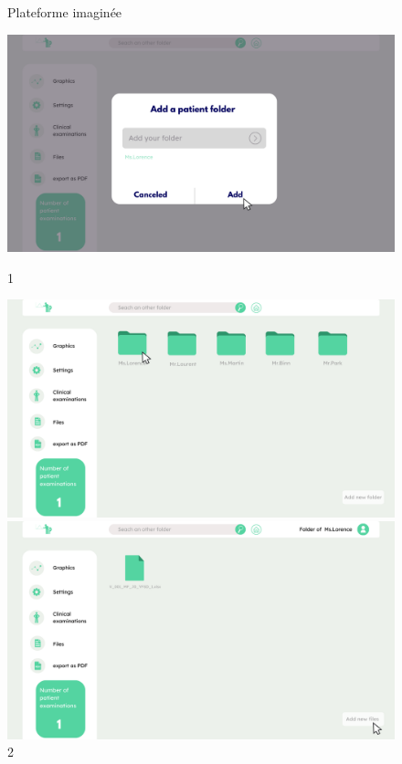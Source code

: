 \begin{figure}[H]
    \centering
    \caption{Plateforme imaginée}
    \begin{minipage}{0.3\textwidth}
        \centering
        \includegraphics[width=\textwidth]{images/Prototype/1.png}
        \caption*{1}
    \end{minipage}
    \begin{minipage}{0.3\textwidth}
        \centering
        \includegraphics[width=\textwidth]{images/Prototype/Accueil de la plateforme de visualisation.png}
        \caption*{2}
    \end{minipage}
    \begin{minipage}{0.3\textwidth}
        \centering
        \includegraphics[width=\textwidth]{images/Prototype/3.png}

\end{minipage}
\end{figure}
